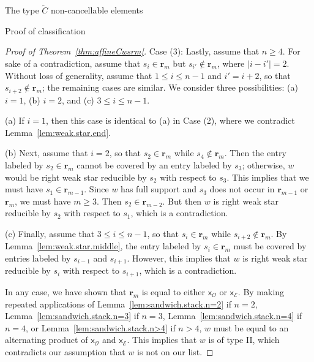 \documentclass[12pt]{amsart}
\newcommand{\C}{\widetilde{C}}
\renewcommand{\O}{\mathcal{O}}
\newcommand{\E}{\mathcal{E}}
\newcommand{\x}{\mathsf{x}}
\renewcommand{\(}{\left(}
\renewcommand{\)}{\right)}
\renewcommand{\r}{\mathbf{r}}
\begin{document}
\begin{section}{The type $\C$ non-cancellable elements}
\begin{subsection}{Proof of classification}
\begin{proof}[Proof of Theorem~\ref{thm:affineCwsrm}]
Case (3):  Lastly, assume that $n\geq 4$.  For sake of a contradiction, assume that $s_{i} \in \r_{m}$ but $s_{i'} \notin \r_{m}$, where $|i-i'|=2$.  Without loss of generality, assume that $1\leq i \leq n-1$ and $i'=i+2$, so that $s_{i+2} \notin \r_{m}$; the remaining cases are similar.  We consider three possibilities: (a) $i=1$, (b) $i=2$, and (c) $3\leq i \leq n-1$.

(a) If $i=1$, then this case is identical to (a) in Case (2), where we contradict Lemma~\ref{lem:weak.star.end}.

(b) Next, assume that $i=2$, so that $s_{2} \in \r_{m}$ while $s_{4} \notin \r_{m}$.  Then the entry labeled by $s_{2} \in \r_{m}$ cannot be covered by an entry labeled by $s_{3}$; otherwise, $w$ would be right weak star reducible by $s_{2}$ with respect to $s_{3}$.  This implies that we must have $s_{1} \in \r_{m-1}$.  Since $w$ has full support and $s_{3}$ does not occur in $\r_{m-1}$ or $\r_{m}$, we must have $m \geq 3$.  Then $s_{2} \in \r_{m-2}$.  But then $w$ is right weak star reducible by $s_{2}$ with respect to $s_{1}$, which is a contradiction.

(c) Finally, assume that $3\leq i \leq n-1$, so that $s_{i} \in \r_{m}$ while $s_{i+2} \notin \r_{m}$.  By Lemma~\ref{lem:weak.star.middle}, the entry labeled by $s_{i} \in \r_{m}$ must be covered by entries labeled by $s_{i-1}$ and $s_{i+1}$.  However, this implies that $w$ is right weak star reducible by $s_{i}$ with respect to $s_{i+1}$, which is a contradiction.

In any case, we have shown that $\r_m$ is equal to either $\x_\O$ or $\x_\E$.  By making repeated applications of Lemma~\ref{lem:sandwich.stack.n=2} if $n=2$,  Lemma~\ref{lem:sandwich.stack.n=3} if $n=3$, Lemma~\ref{lem:sandwich.stack.n=4} if $n=4$, or Lemma~\ref{lem:sandwich.stack.n>4} if $n>4$, $w$ must be equal to an alternating product of $\x_{\O}$ and $\x_{\E}$.  This implies that $w$ is of type II, which contradicts our assumption that $w$ is not on our list. %
\end{proof}

\end{subsection}

\end{section}

\end{document}
